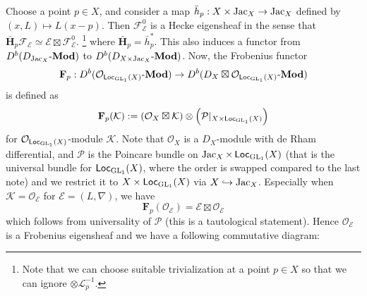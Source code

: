 Choose a point $p \in X$, and consider a map $\bar{h}_p: X \times \operatorname{\mathrm{Jac}}_X \to \operatorname{\mathrm{Jac}}_X$ defined by
$(x, L) \mapsto L(x-p)$.
Then $\mathcal{F}_{\mathcal{E}}^{0}$ is a Hecke eigensheaf in the sense that $\bar{\mathbf{H}}_p\mathcal{F}_{\mathcal{E}} \simeq \mathcal{E} \boxtimes \mathcal{F}_{\mathcal{E}}^{0}$.
\footnote{Note that we can choose suitable trivialization at a point $p \in X$ so that we can ignore $\otimes \mathcal{L}_p^{-1}$.}
where $\bar{\mathbf{H}}_p = \bar{h}_p^{*}$.
This also induces a functor from $D^{b}(D_{\operatorname{\mathrm{Jac}}_X}\text{-}\mathbf{Mod})$ to $D^{b}(D_{X \times \operatorname{\mathrm{Jac}}_X}\text{-}\mathbf{Mod})$.
Now, the Frobenius functor
$$
\mathbf{F}_p: D^{b}(\mathcal{O}_{\operatorname{\mathsf{Loc}}_{\operatorname{\mathrm{GL}}_1}(X)}\text{-}\mathbf{Mod}) \to D^{b}(D_X \boxtimes \mathcal{O}_{\operatorname{\mathsf{Loc}}_{\operatorname{\mathrm{GL}}_1}(X)}\text{-}\mathbf{Mod})
$$
is defined as
$$
\mathbf{F}_p(\mathcal{K}):= (\mathcal{O}_X \boxtimes \mathcal{K}) \otimes \left(\mathcal{P}|_{X \times \operatorname{\mathsf{Loc}}_{\operatorname{\mathrm{GL}}_1}(X)}\right)
$$
for $\mathcal{O}_{\operatorname{\mathsf{Loc}}_{\operatorname{\mathrm{GL}}_1}(X)}$-module $\mathcal{K}$.
Note that $\mathcal{O}_X$ is a $D_X$-module with de Rham differential, and $\mathcal{P}$ is the Poincare bundle
on $\operatorname{\mathrm{Jac}}_X \times \operatorname{\mathsf{Loc}}_{\operatorname{\mathrm{GL}}_1}(X)$ (that is the universal bundle for $\operatorname{\mathsf{Loc}}_{\operatorname{\mathrm{GL}}_1}(X)$, where the order is swapped compared to the last note)
and we restrict it to $X \times \operatorname{\mathsf{Loc}}_{\operatorname{\mathrm{GL}}_1}(X)$ via $X \hookrightarrow \operatorname{\mathrm{Jac}}_X$.
Especially when $\mathcal{K} = \mathcal{O}_{\mathcal{E}}$ for $\mathcal{E} = (L, \nabla)$, we have
$$
\mathbf{F}_p(\mathcal{O}_{\mathcal{E}}) = \mathcal{E} \boxtimes \mathcal{O}_{\mathcal{E}}
$$
which follows from universality of $\mathcal{P}$ (this is a tautological statement).
Hence $\mathcal{O}_{\mathcal{E}}$ is a Frobenius eigensheaf and we have a following commutative diagram:
\begin{center}
\end{center}

